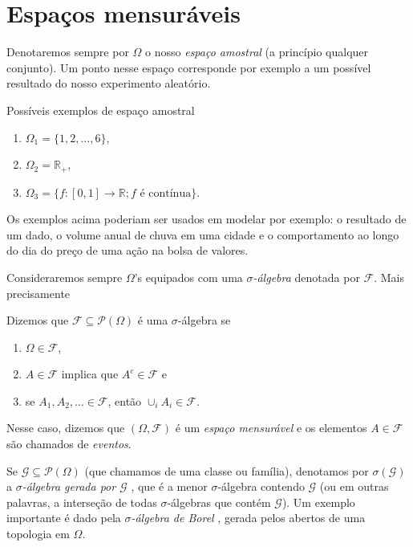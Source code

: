 \section{Espaços mensuráveis}

Denotaremos sempre por $\Omega$ o nosso \emph{espaço amostral}  (a princípio qualquer conjunto).
Um ponto nesse espaço corresponde por exemplo a um possível resultado do nosso experimento aleatório.

\begin{example} Possíveis exemplos de espaço amostral
  \label{x:espacos_amostrais}
  \begin{enumerate}[\quad a)]
  \item $\Omega_1 = \{1, 2, \dots, 6\}$,
  \item $\Omega_2 = \mathbb{R}_+$,
  \item $\Omega_3 = \{f:[0,1] \to \mathbb{R}; \text{$f$ é contínua}\}$.
  \end{enumerate}
\end{example}
Os exemplos acima poderiam ser usados em modelar por exemplo: o resultado de um dado, o volume anual de chuva em uma cidade e o comportamento ao longo do dia do preço de uma ação na bolsa de valores.

Consideraremos sempre $\Omega$'s equipados com uma \emph{$\sigma$-álgebra}  denotada por $\mathcal{F}$.
Mais precisamente
\begin{definition}
  Dizemos que $\mathcal{F} \subseteq \mathcal{P}(\Omega)$ é uma $\sigma$-álgebra se
  \begin{enumerate}[\quad a)]
  \item $\Omega \in \mathcal{F}$,
  \item $A \in \mathcal{F}$ implica que $A^c \in \mathcal{F}$ e
  \item se $A_1, A_2, \dots \in \mathcal{F}$, então $\cup_i A_i \in \mathcal{F}$.
  \end{enumerate}
\end{definition}
Nesse caso, dizemos que $(\Omega, \mathcal{F})$ é um \emph{espaço mensurável}
 e os elementos $A \in \mathcal{F}$ são chamados de \emph{eventos}. 

Se $\mathcal{G} \subseteq \mathcal{P}(\Omega)$ (que chamamos de uma classe ou família), denotamos por $\sigma(\mathcal{G})$ a
\emph{$\sigma$-álgebra gerada por $\mathcal{G}$} , que é a menor $\sigma$-álgebra
contendo $\mathcal{G}$ (ou em outras palavras, a interseção de todas $\sigma$-álgebras que contém $\mathcal{G}$).
Um exemplo importante é dado pela \emph{$\sigma$-álgebra de Borel} , gerada pelos abertos de uma topologia em $\Omega$.


